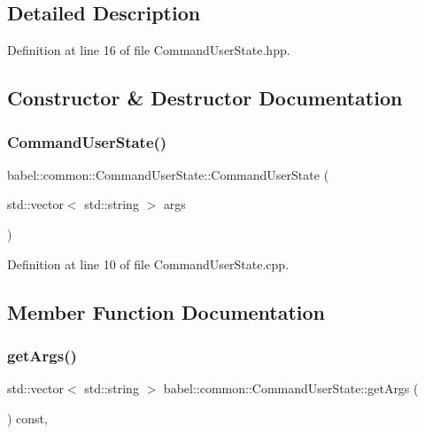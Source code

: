 \subsection{Detailed Description}


Definition at line 16 of file Command\+User\+State.\+hpp.



\subsection{Constructor \& Destructor Documentation}
\mbox{\label{classbabel_1_1common_1_1_command_user_state_a4741021eb52f138b8a71a51c08ee8b47}} 
\subsubsection{\texorpdfstring{Command\+User\+State()}{CommandUserState()}}
{\footnotesize\ttfamily babel\+::common\+::\+Command\+User\+State\+::\+Command\+User\+State (\begin{DoxyParamCaption}\item[{std\+::vector$<$ std\+::string $>$}]{args }\end{DoxyParamCaption})}



Definition at line 10 of file Command\+User\+State.\+cpp.



\subsection{Member Function Documentation}
\mbox{\label{classbabel_1_1common_1_1_command_user_state_adab3d234b9ced9224e3036802cc2794d}} 
\subsubsection{\texorpdfstring{get\+Args()}{getArgs()}}
{\footnotesize\ttfamily std\+::vector$<$ std\+::string $>$ babel\+::common\+::\+Command\+User\+State\+::get\+Args (\begin{DoxyParamCaption}{ }\end{DoxyParamCaption}) const\hspace{0.3cm}{\ttfamily [override]}, {\ttfamily [virtual]}}



